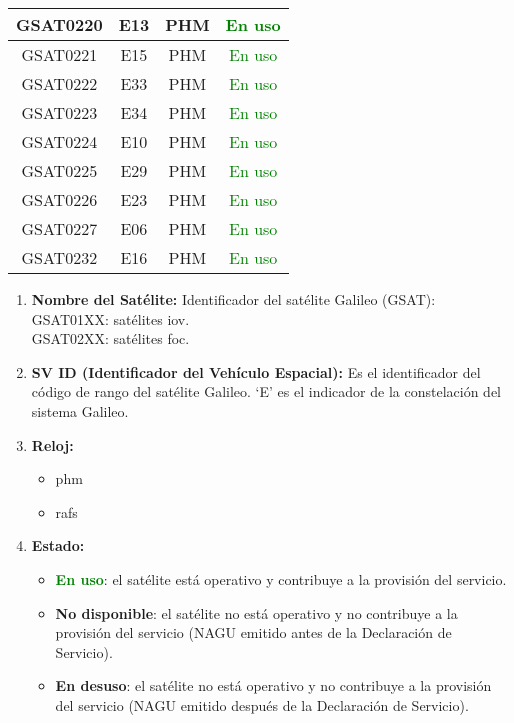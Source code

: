 \begin{center}
\begin{longtable}{|c|c|c|c|}
        \hline
        GSAT0220 & E13 & PHM & \textcolor{green}{En uso} \\
        \hline
        GSAT0221 & E15 & PHM & \textcolor{green}{En uso} \\
        \hline
        GSAT0222 & E33 & PHM & \textcolor{green}{En uso} \\
        \hline
        GSAT0223 & E34 & PHM & \textcolor{green}{En uso} \\
        \hline
        GSAT0224 & E10 & PHM & \textcolor{green}{En uso} \\
        \hline
        GSAT0225 & E29 & PHM & \textcolor{green}{En uso} \\
        \hline
        GSAT0226 & E23 & PHM & \textcolor{green}{En uso} \\
        \hline
        GSAT0227 & E06 & PHM & \textcolor{green}{En uso} \\
        \hline
        GSAT0232 & E16 & PHM & \textcolor{green}{En uso} \\
    \end{longtable}
\end{center}

\begin{justify}
    \begin{enumerate}
        \item \textbf{Nombre del Satélite:} Identificador del satélite Galileo (GSAT): \\
        GSAT01XX: satélites \gls{iov}. \\
        GSAT02XX: satélites \gls{foc}.
        \item \textbf{SV ID (Identificador del Vehículo Espacial):} Es el identificador del código de rango del satélite Galileo. ‘E’ es el indicador de la constelación del sistema Galileo.
        \item \textbf{Reloj:}
        \begin{itemize}
            \item \gls{phm}
            \item \gls{rafs}
        \end{itemize}
        \item \textbf{Estado:}
        \begin{itemize}
            \item \textbf{\textcolor{green}{En uso}}: el satélite está operativo y contribuye a la provisión del servicio.
            \item \textbf{\textcolor{burgundy}{No disponible}}: el satélite no está operativo y no contribuye a la provisión del servicio (NAGU emitido antes de la Declaración de Servicio).
            \item \textbf{\textcolor{burgundy}{En desuso}}: el satélite no está operativo y no contribuye a la provisión del servicio (NAGU emitido después de la Declaración de Servicio).
        \end{itemize}
    \end{enumerate}
\end{justify}

